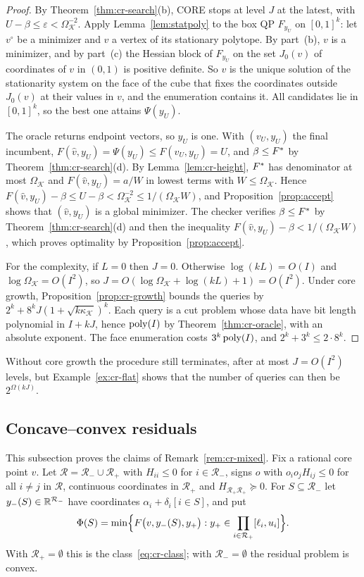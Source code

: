 \begin{proof}
By Theorem~\ref{thm:cr-search}(b), CORE stops at level $J$ at the latest,
with $U-\beta\le\varepsilon<\Omega_{\mathcal K}^{-2}$. Apply
Lemma~\ref{lem:statpoly} to the box QP $F_{y_U}$ on $[0,1]^k$: let $v^\circ$
be a minimizer and $v$ a vertex of its stationary polytope. By part~(b), $v$ is a
minimizer, and by part~(c) the Hessian block of $F_{y_U}$ on the set
$J_0(v)$ of coordinates of $v$ in $(0,1)$ is positive definite. So $v$ is the unique solution of the stationarity
system on the face of the cube that fixes the coordinates outside $J_0(v)$
at their values in $v$, and the enumeration contains it. All candidates lie
in $[0,1]^k$, so the best one attains $\Psi(y_U)$.

The oracle returns endpoint vectors, so $y_U$ is one. With $(v_U,y_U)$ the
final incumbent, $F(\hat v,y_U)=\Psi(y_U)\le F(v_U,y_U)=U$, and
$\beta\le F^{*}$ by Theorem~\ref{thm:cr-search}(d). By
Lemma~\ref{lem:cr-height}, $F^{*}$ has denominator at most
$\Omega_{\mathcal K}$ and $F(\hat v,y_U)=a/W$ in lowest terms with
$W\le\Omega_{\mathcal K}$. Hence
$F(\hat v,y_U)-\beta\le U-\beta<\Omega_{\mathcal K}^{-2}\le
1/(\Omega_{\mathcal K}W)$, and Proposition~\ref{prop:accept} shows that
$(\hat v,y_U)$ is a global minimizer. The checker verifies
$\beta\le F^{*}$ by Theorem~\ref{thm:cr-search}(d) and then the inequality
$F(\hat v,y_U)-\beta<1/(\Omega_{\mathcal K}W)$, which proves optimality by
Proposition~\ref{prop:accept}.

For the complexity, if $L=0$ then $J=0$. Otherwise
$\log(kL)=O(I)$ and $\log\Omega_{\mathcal K}=O(I^2)$, so
$J=O(\log\Omega_{\mathcal K}+\log(kL)+1)=O(I^2)$.
Under core growth, Proposition~\ref{prop:cr-growth} bounds the queries by
$2^k+8^kJ(1+\sqrt{k\kappa_{\mathcal K}})^k$. Each query is a cut problem
whose data have bit length polynomial in $I+kJ$, hence $\operatorname{poly}(I)$ by
Theorem~\ref{thm:cr-oracle}, with an absolute exponent. The face
enumeration costs $3^k\operatorname{poly}(I)$, and $2^k+3^k\le2\cdot8^k$.
\end{proof}

Without core growth the procedure still terminates, after at most
$J=O(I^2)$ levels, but Example~\ref{ex:cr-flat} shows that the number of
queries can then be $2^{\Omega(kJ)}$.

\subsection{Concave--convex residuals}

This subsection proves the claims of Remark~\ref{rem:cr-mixed}. Fix a
rational core point $v$. Let $\mathcal R=\mathcal R_-\cup\mathcal R_+$ with
$H_{ii}\le0$ for $i\in\mathcal R_-$, signs $o$ with $o_io_jH_{ij}\le0$ for
all $i\ne j$ in $\mathcal R$, continuous coordinates in $\mathcal R_+$ and
$H_{\mathcal R_+\mathcal R_+}\succeq0$. For $S\subseteq\mathcal R_-$
let $y_-(S)\in\mathbb R^{\mathcal R_-}$ have coordinates
$\alpha_i+\delta_i[i\in S]$, and put
\[
\Phi(S)=\min\Bigl\{F\bigl(v,y_-(S),y_+\bigr):
y_+\in\prod_{i\in\mathcal R_+}[\ell_i,u_i]\Bigr\}.
\]
With $\mathcal R_+=\emptyset$ this is the class~\eqref{eq:cr-class}; with
$\mathcal R_-=\emptyset$ the residual problem is convex.

